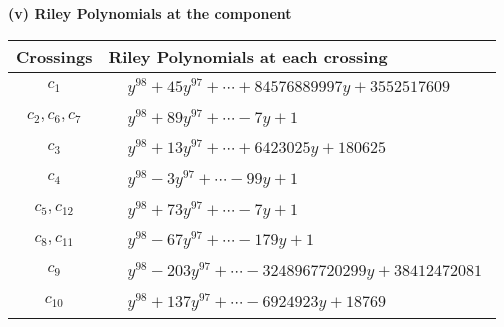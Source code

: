 \documentclass[1p]{elsarticle_modified}
\theoremstyle{definition}
\begin{document}
\newpage\renewcommand{\arraystretch}{1}
\flushleft \textbf{(v) Riley Polynomials at the component}\newline \\
\begin{tabular}{m{50pt}|m{274pt}}
Crossings & \hspace{64pt}Riley Polynomials at each crossing \\
\hline $$\begin{aligned}c_{1}\end{aligned}$$&$\begin{aligned}
&y^{98}+45 y^{97}+\cdots+84576889997 y+3552517609
\end{aligned}$\\
\hline $$\begin{aligned}c_{2},c_{6},c_{7}\end{aligned}$$&$\begin{aligned}
&y^{98}+89 y^{97}+\cdots-7 y+1
\end{aligned}$\\
\hline $$\begin{aligned}c_{3}\end{aligned}$$&$\begin{aligned}
&y^{98}+13 y^{97}+\cdots+6423025 y+180625
\end{aligned}$\\
\hline $$\begin{aligned}c_{4}\end{aligned}$$&$\begin{aligned}
&y^{98}-3 y^{97}+\cdots-99 y+1
\end{aligned}$\\
\hline $$\begin{aligned}c_{5},c_{12}\end{aligned}$$&$\begin{aligned}
&y^{98}+73 y^{97}+\cdots-7 y+1
\end{aligned}$\\
\hline $$\begin{aligned}c_{8},c_{11}\end{aligned}$$&$\begin{aligned}
&y^{98}-67 y^{97}+\cdots-179 y+1
\end{aligned}$\\
\hline $$\begin{aligned}c_{9}\end{aligned}$$&$\begin{aligned}
&y^{98}-203 y^{97}+\cdots-3248967720299 y+38412472081
\end{aligned}$\\
\hline $$\begin{aligned}c_{10}\end{aligned}$$&$\begin{aligned}
&y^{98}+137 y^{97}+\cdots-6924923 y+18769
\end{aligned}$\\
\hline
\end{tabular}\\~\\
\end{document}
